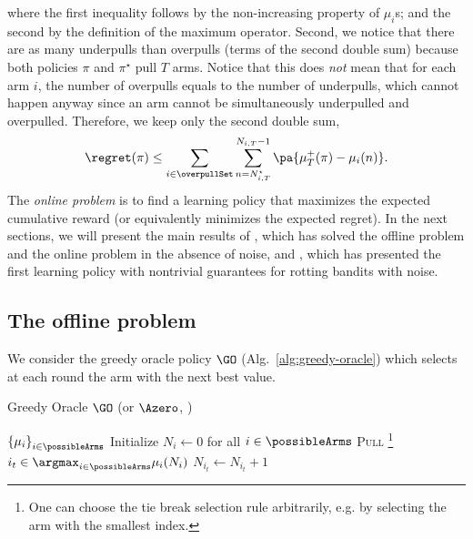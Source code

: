 where the first inequality follows by the non-increasing property of $\mu_i$s; and the second by the definition of the maximum operator. Second, we notice that there are as many underpulls than overpulls (terms of the second double sum) because both policies $ \pi$ and $\pi^\star$ pull $T$ arms. Notice that this does \emph{not} mean that for each arm $i$, the number of overpulls equals to the number of underpulls, which cannot happen anyway since an arm cannot be simultaneously underpulled and overpulled. Therefore, we keep only the second double sum,
\begin{equation}
\label{eq:regret-first-bound}
\regret(\pi) \leq \sum_{i\in \overpullSet}   \sum_{n=N_{i,T}^\star}^{N_{i,T}-1} \pa{\mu^+_T(\pi) - \mu_i(n)}.
\end{equation}
%
The \textit{online problem} is to find a learning policy that maximizes the expected cumulative reward (or equivalently minimizes the expected regret). In the next sections, we will present the main results of \citet{heidari2016tight}, which has solved the offline problem and the online problem in the absence of noise, and \citet{levine2017rotting}, which has presented the first learning policy with nontrivial guarantees for rotting bandits with noise. 
%
\subsection{The offline problem \citep{heidari2016tight}}
\label{ss:rested-offline}
We consider the greedy oracle policy $\GO$ (Alg.~\ref{alg:greedy-oracle}) which selects at each round the arm with the next best value.

\begin{minipage}{\textwidth}
\renewcommand*\footnoterule{}
\begin{savenotes}
\begin{algorithm}[H]
\caption{Greedy Oracle $\GO$ (or $\Azero$, \citet{heidari2016tight})}
\label{alg:greedy-oracle}
\begin{algorithmic}[1]
	\Require $\left\{\mu_i\right\}_{i \in \possibleArms}$
	\State Initialize $N_i \leftarrow 0$ for all $i \in \possibleArms$
		\State \textsc{Pull} \footnote{One can choose the tie break selection rule arbitrarily, e.g. by selecting the arm with the smallest index.}  $i_t \in \argmax_{i \in \possibleArms} \mu_i(N_{i})$
		\State $N_{i_t} \leftarrow N_{i_t} + 1$
	\EndFor
\end{algorithmic}
\end{algorithm}
\end{savenotes}
\end{minipage}

